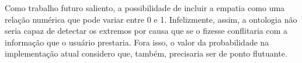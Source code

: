 Como trabalho futuro saliento, a possibilidade de incluir a empatia como uma
relação numérica que pode variar entre 0 e 1. Infelizmente, assim, a ontologia
não seria capaz de detectar os extremos por causa que se o fizesse conflitaria
com a informação que o usuário prestaria. Fora isso, o valor da probabilidade
na implementação atual considero que, também, precisaria ser de ponto flutuante.


